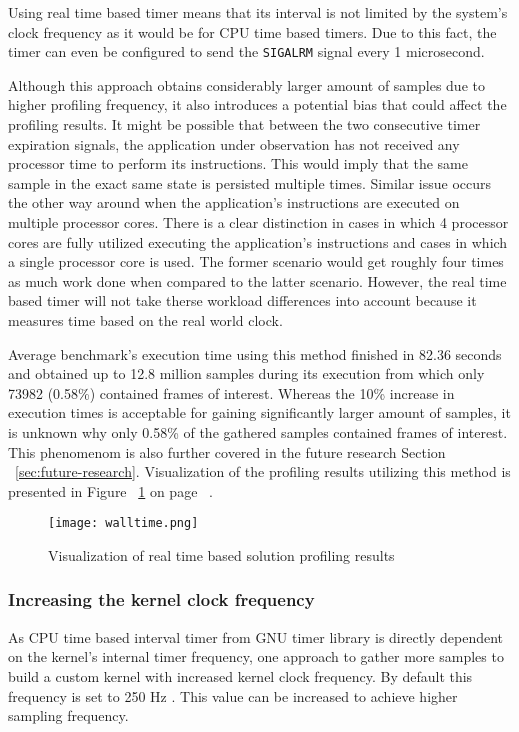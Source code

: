 \documentclass[..thesis.tex]{subfiles}
\begin{document}
Using real time based timer means that its interval is not limited by the system's clock frequency as it would be for CPU time based timers. Due to this fact, the timer can even be configured to send the \texttt{SIGALRM} signal every 1 microsecond.

Although this approach obtains considerably larger amount of samples due to higher profiling frequency, it also introduces a potential bias that could affect the profiling results. It might be possible that between the two consecutive timer expiration signals, the application under observation has not received any processor time to perform its instructions. This would imply that the same sample in the exact same state is persisted multiple times. Similar issue occurs the other way around when the application's instructions are executed on multiple processor cores. There is a clear distinction in cases in which 4 processor cores are fully utilized executing the application's instructions and cases in which a single processor core is used. The former scenario would get roughly four times as much work done when compared to the latter scenario. However, the real time based timer will not take therse workload differences into account because it measures time based on the real world clock.

Average benchmark's execution time using this method finished in 82.36 seconds and obtained up to 12.8 million samples during its execution from which only 73982 (0.58\%) contained frames of interest. Whereas the 10\% increase in execution times is acceptable for gaining significantly larger amount of samples, it is unknown why only 0.58\% of the gathered samples contained frames of interest. This phenomenom is also further covered in the future research Section ~\ref{sec:future-research}. Visualization of the profiling results utilizing this method is presented in Figure ~\ref{fig:walltime} on page ~\pageref{fig:walltime}.
\begin{figure}[H]
\texttt{[image: walltime.png]}
\caption{Visualization of real time based solution profiling results}
\label{fig:walltime}
\end{figure}

\subsubsection{Increasing the kernel clock frequency}
\label{kernel-clock}
As CPU time based interval timer from GNU timer library is directly dependent on the kernel's internal timer frequency, one approach to gather more samples to build a custom kernel with increased kernel clock frequency. By default this frequency is set to 250 Hz \cite{torvalds_linux:_2018}. This value can be increased to achieve higher sampling frequency. 
\end{document}
